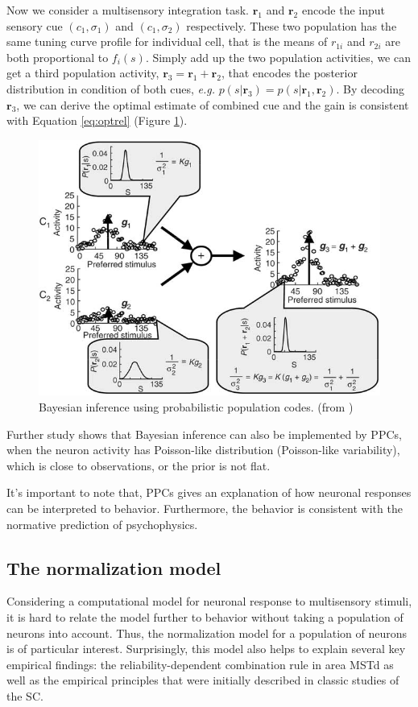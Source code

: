 \documentclass{article}[11pt]
\newcommand{\eg}{\textit{e.g. }}
\begin{document}
Now we consider a multisensory integration task. $\mathbf{r}_1$ and $\mathbf{r}_2$ encode the input sensory cue $(c_1, \sigma_1)$ and $(c_1, \sigma_2)$ respectively. These two population has the same tuning curve profile for individual cell, that is the means of $r_{1i}$ and $r_{2i}$ are both proportional to $f_i(s)$. Simply add up the two population activities, we can get a third population activity, $\mathbf{r}_3 = \mathbf{r}_1 + \mathbf{r}_2$, that encodes the posterior distribution in condition of both cues, \eg $p(s|\mathbf{r}_3) = p(s|\mathbf{r}_1,\mathbf{r}_2)$. By decoding $\mathbf{r}_3$, we can derive the optimal estimate of combined cue and the gain is consistent with Equation \ref{eq:optrel} (Figure \ref{fig:infer}).

\begin{figure}[tpb]
  \centering
  \includegraphics[width=.8\textwidth]{infer}
  \caption{Bayesian inference using probabilistic population codes. (from \cite{ma_bayesian_2006})}
  \label{fig:infer}
\end{figure}

Further study shows that Bayesian inference can also be implemented by PPCs, when the neuron activity has Poisson-like distribution (Poisson-like variability), which is close to observations, or the prior is not flat.

It's important to note that, PPCs gives an explanation of how neuronal responses can be interpreted to behavior. Furthermore, the behavior is consistent with the normative prediction of psychophysics.

\subsection{The normalization model}
Considering a computational model for neuronal response to multisensory stimuli, it is hard to relate the model further to behavior without taking a population of neurons into account. Thus, the normalization model \cite{ohshiro_normalization_2011} for a population of neurons is of particular interest. Surprisingly, this model also helps to explain several key empirical findings: the reliability-dependent combination rule in area MSTd as well as the empirical principles that were initially described in classic studies of the SC.
\end{document}
